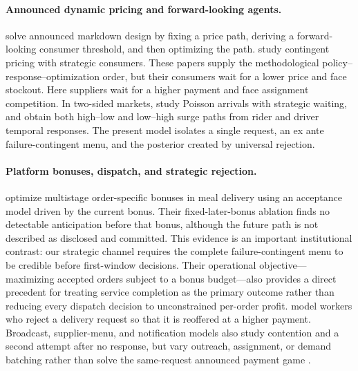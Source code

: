 \documentclass[mnsc,blindrev]{informs3}
\begin{document}
\paragraph{Announced dynamic pricing and forward-looking agents.}
\citet{AvivPazgal2008} solve announced markdown design by fixing a price path,
deriving a forward-looking consumer threshold, and then optimizing the path.
\citet{CorreaEtAl2016} study contingent pricing with strategic consumers.
These papers supply the methodological policy--response--optimization order,
but their consumers wait for a lower price and face stockout.  Here suppliers
wait for a higher payment and face assignment competition.  In two-sided
markets, \citet{ChenHu2020} study Poisson arrivals with strategic waiting, and
\citet{HuHuZhu2022} obtain both high--low and low--high surge paths from rider
and driver temporal responses.  The present model isolates a single request,
an ex ante failure-contingent menu, and the posterior created by universal
rejection.

\paragraph{Platform bonuses, dispatch, and strategic rejection.}
\citet{WuEtAl2022} optimize multistage order-specific bonuses in meal delivery
using an acceptance model driven by the current bonus.  Their fixed-later-bonus
ablation finds no detectable anticipation before that bonus, although the
future path is not described as disclosed and committed.  This evidence is an
important institutional contrast: our strategic channel requires the complete
failure-contingent menu to be credible before first-window decisions.
Their operational objective---maximizing accepted orders subject to a bonus
budget---also provides a direct precedent for treating service completion as
the primary outcome rather than reducing every dispatch decision to
unconstrained per-order profit.
\citet{SiggEtAl2025} model
workers who reject a delivery request so that it is reoffered at a higher
payment.  Broadcast, supplier-menu, and notification models also study
contention and a second attempt after no response, but vary outreach,
assignment, or demand batching rather than solve the same-request announced
payment game \citep{SunEtAl2020,HornerEtAl2021,AusseilEtAl2022,
FengEtAl2023,QinEtAl2025}.
\end{document}
